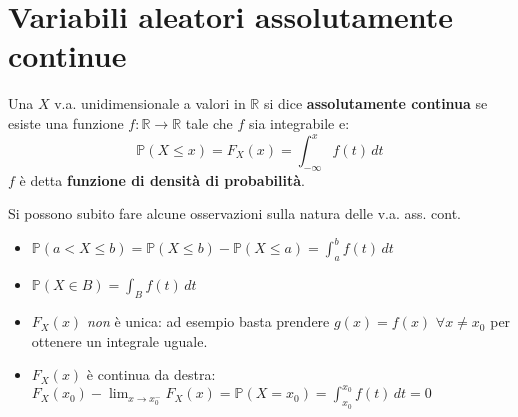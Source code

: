 \section{Variabili aleatori assolutamente continue}

\begin{definition}
Una $X$ v.a. unidimensionale a valori in $\mathbb{R}$ si dice \textbf{assolutamente continua} se esiste una funzione $f:\mathbb{R}\longrightarrow\mathbb{R}$ tale che $f$ sia integrabile e:
\[\mathbb{P}(X\leq x)=F_X(x)=\int_{-\infty}^{x} f(t) \,dt \]
$f$ è detta \textbf{funzione di densità di probabilità}.
\end{definition}

\vspace{10px}

Si possono subito fare alcune osservazioni sulla natura delle v.a. ass. cont.

\begin{observation}
\noindent
\begin{itemize}
    \item $\mathbb{P}(a<X\leq b)=\mathbb{P}(X\leq b)-\mathbb{P}(X\leq a)=\int_a^b f(t) \, dt$
    \item $\mathbb{P}(X\in B)=\int_B f(t) \, dt$
    \item $F_X(x)$ \textit{non} è unica: ad esempio basta prendere $g(x)=f(x)$ $\forall x\neq x_0$ per ottenere un integrale uguale.
    \item $F_X(x)$ è continua da destra: $F_X(x_0)-\lim_{x\to x_0^-}F_X(x)=\mathbb{P}(X=x_0)=\int_{x_0}^{x_0} f(t) \, dt=0$
\end{itemize}
\end{observation}

\vspace{15px}

